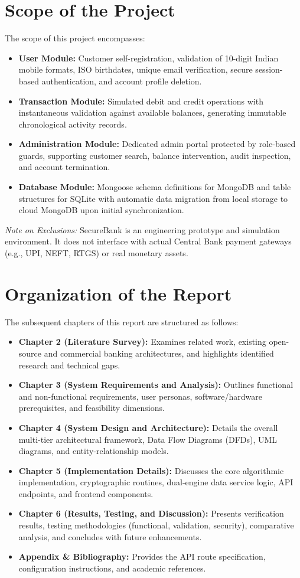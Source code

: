 \section{Scope of the Project}
The scope of this project encompasses:
\begin{itemize}
    \item \textbf{User Module:} Customer self-registration, validation of 10-digit Indian mobile formats, ISO birthdates, unique email verification, secure session-based authentication, and account profile deletion.
    \item \textbf{Transaction Module:} Simulated debit and credit operations with instantaneous validation against available balances, generating immutable chronological activity records.
    \item \textbf{Administration Module:} Dedicated admin portal protected by role-based guards, supporting customer search, balance intervention, audit inspection, and account termination.
    \item \textbf{Database Module:} Mongoose schema definitions for MongoDB and table structures for SQLite with automatic data migration from local storage to cloud MongoDB upon initial synchronization.
\end{itemize}
\textit{Note on Exclusions:} SecureBank is an engineering prototype and simulation environment. It does not interface with actual Central Bank payment gateways (e.g., UPI, NEFT, RTGS) or real monetary assets.

\section{Organization of the Report}
The subsequent chapters of this report are structured as follows:
\begin{itemize}
    \item \textbf{Chapter 2 (Literature Survey):} Examines related work, existing open-source and commercial banking architectures, and highlights identified research and technical gaps.
    \item \textbf{Chapter 3 (System Requirements and Analysis):} Outlines functional and non-functional requirements, user personas, software/hardware prerequisites, and feasibility dimensions.
    \item \textbf{Chapter 4 (System Design and Architecture):} Details the overall multi-tier architectural framework, Data Flow Diagrams (DFDs), UML diagrams, and entity-relationship models.
    \item \textbf{Chapter 5 (Implementation Details):} Discusses the core algorithmic implementation, cryptographic routines, dual-engine data service logic, API endpoints, and frontend components.
    \item \textbf{Chapter 6 (Results, Testing, and Discussion):} Presents verification results, testing methodologies (functional, validation, security), comparative analysis, and concludes with future enhancements.
    \item \textbf{Appendix \& Bibliography:} Provides the API route specification, configuration instructions, and academic references.
\end{itemize}

